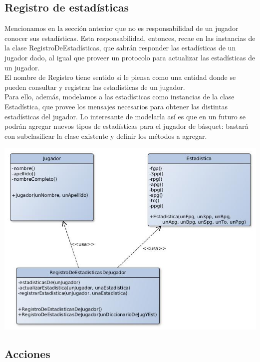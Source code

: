 \subsection{Registro de estadísticas}
Mencionamos en la sección anterior que no es responsabilidad de un jugador conocer sus estadísticas. Esta responsabilidad, entonces, recae en las instancias de la clase RegistroDeEstadísticas, que sabrán responder las estadísticas de un jugador dado, al igual que proveer un protocolo para actualizar las estadísticas de un jugador.\\
El nombre de Registro tiene sentido si le piensa como una entidad donde se pueden consultar y registrar las estadísticas de un jugador.\\
Para ello, además, modelamos a las estadísticas como instancias de la clase Estadística, que provee los mensajes necesarios para obtener las distintas estadísticas del jugador. Lo interesante de modelarla así es que en un futuro se podrán agregar nuevos tipos de estadísticas para el jugador de básquet: bastará con subclasificar la clase existente y definir los métodos a agregar.\\
\begin{center}
\includegraphics[scale=0.4]{diseno/registroDeEstadisticas.jpg}
\end{center}



\subsection{Acciones}

